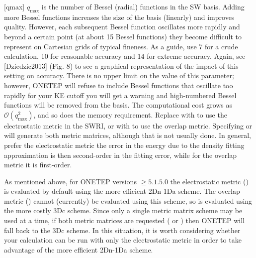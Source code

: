 \documentclass[letterpaper,10pt,english]{sphinxmanual}
\begin{document}
{[}qmax{]} \(q_{\textrm{max}}\) is the number of Bessel (radial)
functions in the SW basis. Adding more Bessel functions increases the
size of the basis (linearly) and improves quality. However, each
subsequent Bessel function oscillates more rapidly and beyond a certain
point (at about 15 Bessel functions) they become difficult to represent
on Cartesian grids of typical fineness. As a guide, use 7 for a crude
calculation, 10 for reasonable accuracy and 14 for extreme accuracy.
Again, see {[}Dziedzic2013{]} (Fig. 8) to see a graphical
representation of the impact of this setting on accuracy. There is no
upper limit on the value of this parameter; however, ONETEP will refuse
to include Bessel functions that oscillate too rapidly for your KE
cutoff \textendash{} you will get a warning and high-numbered Bessel functions will
be removed from the basis. The computational cost grows as
\({\mathcal{O}}(q^2_{\textrm{max}})\), and so does the memory
requirement. Replace  with  to use the electrostatic
metric in the SWRI, or with  to use the overlap metric. Specifying
 or  will generate both metric matrices, although that is
not usually done. In general, prefer the electrostatic metric \textendash{} the
error in the energy due to the density fitting approximation is then
second-order in the fitting error, while for the overlap metric it is
first-order.

As mentioned above, for ONETEP versions \(\ge 5.1.5.0\) the
electrostatic metric () is evaluated by default using the more
efficient 2Dn-1Da scheme. The overlap metric () cannot (currently)
be evaluated using this scheme, so is evaluated using the more costly
3Dc scheme. Since only a single metric matrix scheme may be used at a
time, if both metric matrices are requested ( or ) then
ONETEP will fall back to the 3Dc scheme. In this situation, it is worth
considering whether your calculation can be run with only the
electrostatic metric in order to take advantage of the more efficient
2Dn-1Da scheme.
\end{document}
